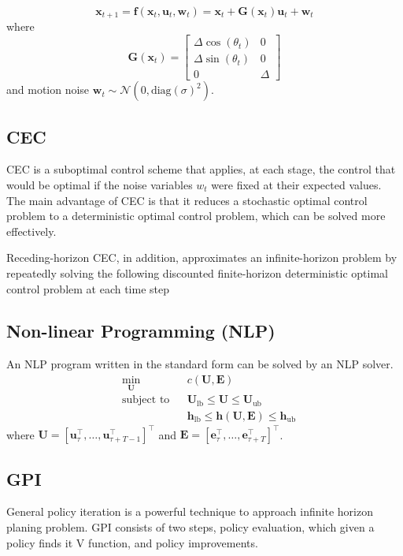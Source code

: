 \documentclass[conference]{IEEEtran}
\begin{document}
\[
\mathbf{x}_{t+1} = \mathbf{f}(\mathbf{x}_t, \mathbf{u}_t, \mathbf{w}_t) = \mathbf{x}_t + \mathbf{G}(\mathbf{x}_t) \mathbf{u}_t + \mathbf{w}_t
\]
where
\[
\mathbf{G}(\mathbf{x}_t) = \begin{bmatrix}
\Delta \cos(\theta_t) & 0 \\
\Delta \sin(\theta_t) & 0 \\
0 & \Delta 
\end{bmatrix}
\]
and motion noise \( \mathbf{w}_t \sim \mathcal{N}(0, \mathrm{diag}(\sigma)^2) \).

\subsection{CEC}
CEC is a suboptimal control scheme that applies, at each stage, 
the control that would be optimal
if the noise variables $w_t$ were fixed at their expected values. 
The main advantage of CEC is that it reduces 
a stochastic optimal control problem to a deterministic optimal control problem, 
which can be solved more effectively. 

Receding-horizon CEC, in addition, 
approximates an infinite-horizon problem by repeatedly solving the following discounted finite-horizon
deterministic optimal control problem at each time step

\subsection{Non-linear Programming (NLP)}
An NLP program written in the standard form can be solved by an NLP solver.
\[
\begin{aligned}
&\min_{\mathbf{U}} & & c(\mathbf{U}, \mathbf{E}) \\
&\text{subject to} & & \mathbf{U}_{\text{lb}} \leq \mathbf{U} \leq \mathbf{U}_{\text{ub}} \\
& & & \mathbf{h}_{\text{lb}} \leq \mathbf{h}(\mathbf{U}, \mathbf{E}) \leq \mathbf{h}_{\text{ub}}
\end{aligned}
\]
where \( \mathbf{U} = [\mathbf{u}_\tau^\top, \ldots, \mathbf{u}_{\tau+T-1}^\top]^\top \) and \( \mathbf{E} = [\mathbf{e}_\tau^\top, \ldots, \mathbf{e}_{\tau+T}^\top]^\top \).

\subsection{GPI}
General policy iteration is a powerful technique to approach 
infinite horizon planing problem.
GPI consists of two steps, policy evaluation, which given a policy finds it V function,
and policy improvements.
\end{document}
